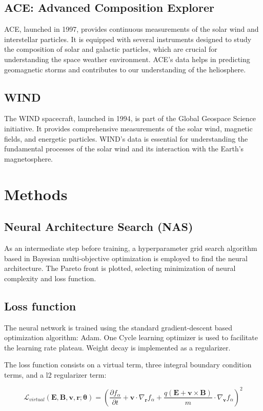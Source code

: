 \documentclass[12pt]{article}
\begin{document}
\subsection{ACE: Advanced Composition Explorer}
ACE, launched in 1997, provides continuous measurements of the solar wind and interstellar particles. It is equipped with several instruments designed to study the composition of solar and galactic particles, which are crucial for understanding the space weather environment. ACE's data helps in predicting geomagnetic storms and contributes to our understanding of the heliosphere.

\subsection{WIND}
The WIND spacecraft, launched in 1994, is part of the Global Geospace Science initiative. It provides comprehensive measurements of the solar wind, magnetic fields, and energetic particles. WIND's data is essential for understanding the fundamental processes of the solar wind and its interaction with the Earth's magnetosphere.

\section{Methods}

\subsection{Neural Architecture Search (NAS)}
As an intermediate step before training, a hyperparameter grid search algorithm based in Bayesian multi-objective optimization is employed to find the neural architecture. The Pareto front is plotted, selecting minimization of neural complexity and loss function.

\subsection{Loss function}
The neural network is trained using the standard gradient-descent based optimization algorithm: Adam. One Cycle learning optimizer is used to facilitate the learning rate plateau. Weight decay is implemented as a regularizer.

The loss function consists on a virtual term, three integral boundary condition terms, and a l2 regularizer term:

\begin{equation}
    \mathcal{L}_{virtual}\left(\mathbf{E}, \mathbf{B}, \mathbf{v}, \mathbf{r}; \mathbf{\theta}\right) = \left(\frac{\partial f_{\alpha}}{\partial t} + \mathbf{v} \cdot \nabla_{\mathbf{r}}  f_{\alpha} + \frac{q (\mathbf{E} + \mathbf{v} \times \mathbf{B})}{m} \cdot \nabla_{\mathbf{v}} f_\alpha \right)^2
\end{equation}
\end{document}
